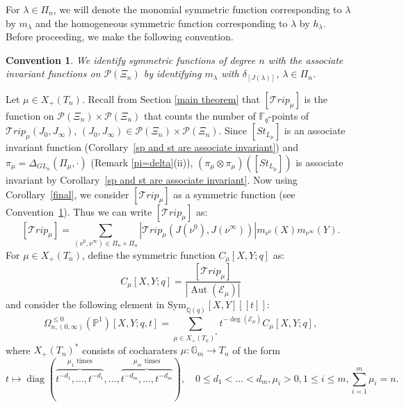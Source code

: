 \documentclass{amsart}
\newcommand{\cE}{\mathcal{E}}
\theoremstyle{plain}
\newtheorem{convention}{Convention}[section]
\theoremstyle{definition}
\theoremstyle{remark}
\DeclareMathOperator{\aut}{Aut}
\DeclareMathOperator{\diag}{diag}
\begin{document}
For $\lambda\in\Pi_{n}$, we will denote the monomial symmetric function corresponding to $\lambda$ by $m_{\lambda} $ and the homogeneous symmetric function corresponding to $\lambda$ by $h_{\lambda}$. Before proceeding, we make the following convention.
\begin{convention}\label{symmetric with functions}
We identify symmetric functions of degree $n$
with the associate invariant functions on $\mathcal{P}(\Xi_{n})$ by identifying $m_{\lambda}$ with $\delta_{[J(\lambda)]}$, $\lambda\in\Pi_{n}$.
\end{convention}
Let $\mu\in X_{+}(T_{n})$. Recall from Section \ref{main theorem} that $[\mathcal{T}rip_{\mu}]$ is the function on $\mathcal{P}(\Xi_{n})\times\mathcal{P}(\Xi_{n})$ that counts the number of $\mathbb{F}_{q}$-points of $\mathcal{T}rip_{\mu}(J_{0},J_{\infty})$, $(J_{0},J_{\infty})\in\mathcal{P}(\Xi_{n})\times\mathcal{P}(\Xi_{n})$. Since $[St_{L_{\mu}}]$ is an associate invariant function (Corollary~\ref{sp and st are associate invariant}) and $\pi_{\mu}=\Delta_{GL_{n}}(\Pi_{\mu},\cdot)$ (Remark \ref{pi=delta}(ii)), $(\pi_{\mu}\otimes\pi_{\mu})([St_{L_{\mu}}])$ is associate invariant by Corollary~\ref{sp and st are associate invariant}. Now using Corollary~\ref{final},
we consider $[\mathcal{T}rip_{\mu}]$ as a symmetric function (see Convention~\ref{symmetric with functions}). Thus we can write $[\mathcal{T}rip_{\mu}]$ as: 
\[
[\mathcal{T}rip_{\mu}]=\sum_{(\nu^{0},\nu^{\infty})\in\Pi_{n}\times\Pi_{n}}|\mathcal{T}rip_{\mu}(J(\nu^{0}),J(\nu^{\infty}))|m_{\nu^{0}}(X)m_{\nu^{\infty}}(Y).
\]
For $\mu\in X_{+}(T_{n})$, define the symmetric function $C_{\mu}[X,Y;q]$ as:
\[
C_{\mu}[X,Y;q]=\frac{[\mathcal{T}rip_{\mu}]}{|\aut(\cE_{\mu})|}
\]
and consider the following element in $\text{Sym}_{\mathbb{Q}(q)}[X,Y][[t]]$:
\[
\Omega_{n,(0,\infty)}^{\leq 0}(\mathbb{P}^{1})[X,Y;q,t]
=
\displaystyle\sum_{\mu\in X_{+}(T_{n})^{*}}t^{-\deg(\cE_{\mu})}C_{\mu}[X,Y;q],
\]
where $X_{+}(T_{n})^{*}$ consists of cocharaters $\mu:\mathbb{G}_{m}\rightarrow T_{n}$ of the form
\[
t\mapsto\diag(\overbrace{t^{-d_{1}},\ldots,t^{-d_{1}}}^{\mu_{1}\text{ times}},\ldots,\overbrace{t^{-d_{m}},\ldots,t^{-d_{m}}}^{\mu_{m}\text{ times}}),\quad 0\leq d_{1}<\ldots<d_{m}, \mu_{i}>0, 1\leq i\leq m, \sum_{i=1}^{m}\mu_{i}=n.
\]
\end{document}
